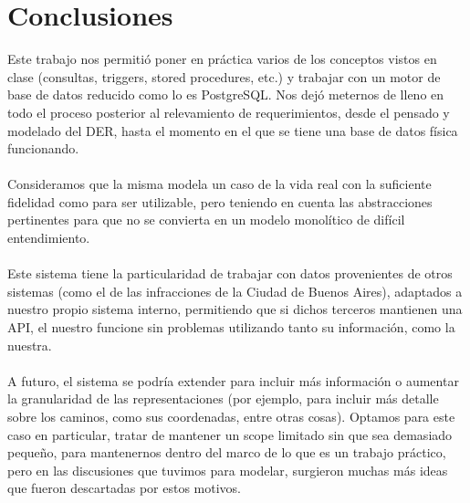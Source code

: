 \section{Conclusiones}
Este trabajo nos permitió poner en práctica varios de los conceptos vistos en clase (consultas, triggers, stored procedures, etc.) y trabajar con un motor de base de datos reducido como lo es PostgreSQL. Nos dejó meternos de lleno en todo el proceso posterior al relevamiento de requerimientos, desde el pensado y modelado del DER, hasta el momento en el que se tiene una base de datos física funcionando.\\
\\
Consideramos que la misma modela un caso de la vida real con la suficiente fidelidad como para ser utilizable, pero teniendo en cuenta las abstracciones pertinentes para que no se convierta en un modelo monolítico de difícil entendimiento.\\
\\
Este sistema tiene la particularidad de trabajar con datos provenientes de otros sistemas (como el de las infracciones de la Ciudad de Buenos Aires), adaptados a nuestro propio sistema interno, permitiendo que si dichos terceros mantienen una API, el nuestro funcione sin problemas utilizando tanto su información, como la nuestra.\\
\\
A futuro, el sistema se podría extender para incluir más información o aumentar la granularidad de las representaciones (por ejemplo, para incluir más detalle sobre los caminos, como sus coordenadas, entre otras cosas). Optamos para este caso en particular, tratar de mantener un scope limitado sin que sea demasiado pequeño, para mantenernos dentro del marco de lo que es un trabajo práctico, pero en las discusiones que tuvimos para modelar, surgieron muchas más ideas que fueron descartadas por estos motivos.